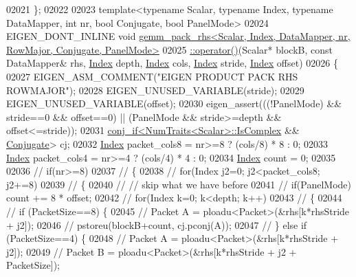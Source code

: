 \begin{DoxyCode}
{02021 \};
02022 
02023 \textcolor{keyword}{template}<\textcolor{keyword}{typename} Scalar, \textcolor{keyword}{typename} Index, \textcolor{keyword}{typename} DataMapper, \textcolor{keywordtype}{int} nr, \textcolor{keywordtype}{bool} Conjugate, \textcolor{keywordtype}{bool} PanelMode>
02024 EIGEN\_DONT\_INLINE \textcolor{keywordtype}{void} 
      \hyperlink{struct_eigen_1_1internal_1_1gemm__pack__rhs}{gemm\_pack\_rhs<Scalar, Index, DataMapper, nr, RowMajor, Conjugate, PanelMode>}
02025 \hyperlink{struct_eigen_1_1internal_1_1gemm__pack__rhs}{  ::operator()}(Scalar* blockB, \textcolor{keyword}{const} DataMapper& rhs, \hyperlink{namespace_eigen_a62e77e0933482dafde8fe197d9a2cfde}{Index} depth, 
      \hyperlink{namespace_eigen_a62e77e0933482dafde8fe197d9a2cfde}{Index} cols, \hyperlink{namespace_eigen_a62e77e0933482dafde8fe197d9a2cfde}{Index} stride, \hyperlink{namespace_eigen_a62e77e0933482dafde8fe197d9a2cfde}{Index} offset)
02026 \{
02027   EIGEN\_ASM\_COMMENT(\textcolor{stringliteral}{"EIGEN PRODUCT PACK RHS ROWMAJOR"});
02028   EIGEN\_UNUSED\_VARIABLE(stride);
02029   EIGEN\_UNUSED\_VARIABLE(offset);
02030   eigen\_assert(((!PanelMode) && stride==0 && offset==0) || (PanelMode && stride>=depth && offset<=stride));
02031   \hyperlink{struct_eigen_1_1internal_1_1conj__if}{conj\_if<NumTraits<Scalar>::IsComplex} && 
      \hyperlink{class_eigen_1_1_conjugate}{Conjugate}> cj;
02032   \hyperlink{namespace_eigen_a62e77e0933482dafde8fe197d9a2cfde}{Index} packet\_cols8 = nr>=8 ? (cols/8) * 8 : 0;
02033   \hyperlink{namespace_eigen_a62e77e0933482dafde8fe197d9a2cfde}{Index} packet\_cols4 = nr>=4 ? (cols/4) * 4 : 0;
02034   \hyperlink{namespace_eigen_a62e77e0933482dafde8fe197d9a2cfde}{Index} count = 0;
02035 
02036 \textcolor{comment}{//   if(nr>=8)}
02037 \textcolor{comment}{//   \{}
02038 \textcolor{comment}{//     for(Index j2=0; j2<packet\_cols8; j2+=8)}
02039 \textcolor{comment}{//     \{}
02040 \textcolor{comment}{//       // skip what we have before}
02041 \textcolor{comment}{//       if(PanelMode) count += 8 * offset;}
02042 \textcolor{comment}{//       for(Index k=0; k<depth; k++)}
02043 \textcolor{comment}{//       \{}
02044 \textcolor{comment}{//         if (PacketSize==8) \{}
02045 \textcolor{comment}{//           Packet A = ploadu<Packet>(&rhs[k*rhsStride + j2]);}
02046 \textcolor{comment}{//           pstoreu(blockB+count, cj.pconj(A));}
02047 \textcolor{comment}{//         \} else if (PacketSize==4) \{}
02048 \textcolor{comment}{//           Packet A = ploadu<Packet>(&rhs[k*rhsStride + j2]);}
02049 \textcolor{comment}{//           Packet B = ploadu<Packet>(&rhs[k*rhsStride + j2 + PacketSize]);}
}
\end{DoxyCode}
